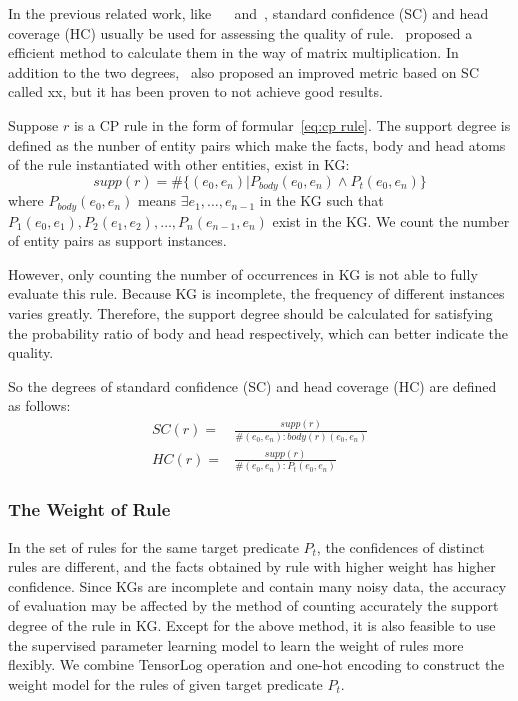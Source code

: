 \documentclass{article}
\begin{document}
	In the previous related work, like~\cite{Chen:ScaLeKB} ~\cite{Galarraga:AMIE+} and~\cite{Omran:RLvLR}, standard confidence (SC) and head coverage (HC) usually be used for assessing the quality of rule.~\cite{Omran:RLvLR} proposed a efficient method to calculate them in the way of matrix multiplication.
	In addition to the two degrees,~\cite{Galarraga:AMIE+} also proposed an improved metric based on SC called xx, but it has been proven to not achieve good results.
	
	Suppose $r$ is a CP rule in the form of formular~\ref{eq:cp rule}. The support degree is defined as the nunber of entity pairs which make the  facts, body and head atoms of the rule instantiated with other entities, exist in KG:
	\begin{equation}
		supp(r) = \#\{(e_0, e_n) | P_{body}(e_0, e_n) \land P_t(e_0, e_n)\} \nonumber
	\end{equation}
	where $P_{body}(e_0, e_n)$ means $\exists e_1, \dots, e_{n-1}$ in the KG such that $P_1(e_0, e_1), P_2(e_1, e_2), \dots, P_n(e_{n-1}, e_n)$ exist in the KG. We count the number of entity pairs as support instances.
	
	However, only counting the number of occurrences in KG is not able to fully evaluate this rule. Because KG is incomplete, the frequency of different instances varies greatly. Therefore, the support degree should be calculated for satisfying the probability ratio of body and head respectively, which can better indicate the quality.
	
	So the degrees of standard confidence
(SC) and head coverage (HC) are defined as follows: 
	\begin{align}
		SC(r) =& \frac{supp(r)}{\#(e_0, e_n):body(r)(e_0, e_n)}\\
		HC(r) =& \frac{supp(r)}{\#(e_0, e_n):P_t( e_0, e_n)}
	\end{align}
	
	\subsubsection{The Weight of Rule}  
	In the set of rules for the same target predicate $P_t$, the confidences of distinct rules are different, and the facts obtained by rule with higher weight has higher confidence. Since KGs are incomplete and contain many noisy data, the accuracy of evaluation may be affected by the method of counting accurately the support degree of the rule in KG. Except for the above method, it is also feasible to use the supervised parameter learning model to learn the weight of rules more flexibly. We combine TensorLog operation and one-hot encoding to construct the weight model for the rules of given target predicate $P_t$.
	
\end{document}
